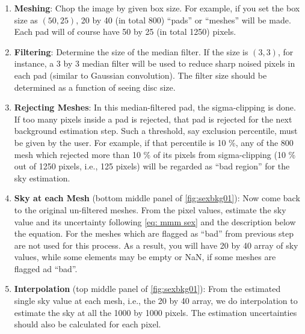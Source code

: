 \begin{enumerate}
\item \textbf{Meshing}: Chop the image by given box size. For example, if you set the box size as $ (50, 25) $, 20 by 40 (in total 800) ``pads'' or ``meshes'' will be made. Each pad will of course have 50 by 25 (in total 1250) pixels.
\item \textbf{Filtering}: Determine the size of the median filter. If the size is $ (3, 3) $, for instance, a 3 by 3 median filter will be used to reduce sharp noised pixels in each pad (similar to Gaussian convolution). The filter size should be determined as a function of seeing disc size. 
\item \textbf{Rejecting Meshes}: In this median-filtered pad, the sigma-clipping is done. If too many pixels inside a pad is rejected, that pad is rejected for the next background estimation step. Such a threshold, say exclusion percentile, must be given by the user. For example, if that percentile is 10 \%, any of the 800 mesh which rejected more than 10 \% of its pixels from sigma-clipping (10 \% out of 1250 pixels, i.e., 125 pixels) will be regarded as ``bad region'' for the sky estimation.
\item \textbf{Sky at each Mesh} (bottom middle panel of \cref{fig:sexbkg01}): Now come back to the original un-filtered meshes. From the pixel values, estimate the sky value and its uncertainty following \cref{eq: mmm sex} and the description below the equation. For the meshes which are flagged as ``bad'' from previous step are not used for this process. As a result, you will have 20 by 40 array of sky values, while some elements may be empty or NaN, if some meshes are flagged ad ``bad''.
\item \textbf{Interpolation} (top middle panel of \cref{fig:sexbkg01}): From the estimated single sky value at each mesh, i.e., the 20 by 40 array, we do interpolation to estimate the sky at all the 1000 by 1000 pixels. The estimation uncertainties should also be calculated for each pixel.
\end{enumerate}

